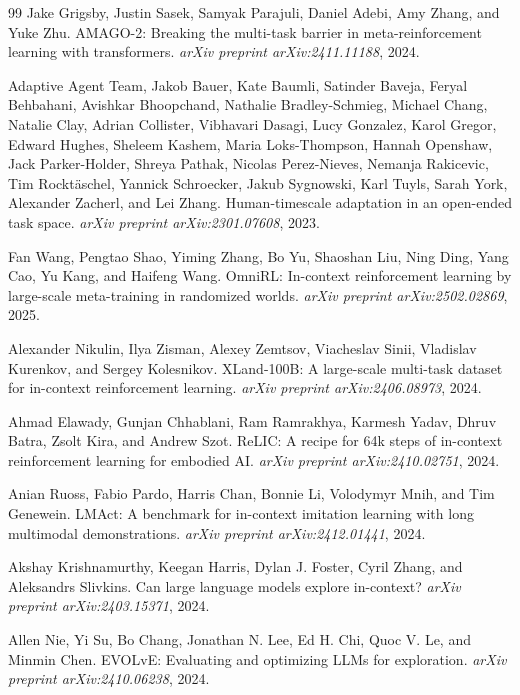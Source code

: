 \documentclass[10pt,twocolumn,letterpaper]{article}
\begin{document}
\begin{thebibliography}{99}
Jake Grigsby, Justin Sasek, Samyak Parajuli, Daniel Adebi, Amy Zhang, and Yuke Zhu.
\newblock AMAGO-2: Breaking the multi-task barrier in meta-reinforcement learning with transformers.
\newblock \emph{arXiv preprint arXiv:2411.11188}, 2024.

Adaptive Agent Team, Jakob Bauer, Kate Baumli, Satinder Baveja, Feryal Behbahani, Avishkar Bhoopchand, Nathalie Bradley-Schmieg, Michael Chang, Natalie Clay, Adrian Collister, Vibhavari Dasagi, Lucy Gonzalez, Karol Gregor, Edward Hughes, Sheleem Kashem, Maria Loks-Thompson, Hannah Openshaw, Jack Parker-Holder, Shreya Pathak, Nicolas Perez-Nieves, Nemanja Rakicevic, Tim Rockt\"aschel, Yannick Schroecker, Jakub Sygnowski, Karl Tuyls, Sarah York, Alexander Zacherl, and Lei Zhang.
\newblock Human-timescale adaptation in an open-ended task space.
\newblock \emph{arXiv preprint arXiv:2301.07608}, 2023.

Fan Wang, Pengtao Shao, Yiming Zhang, Bo Yu, Shaoshan Liu, Ning Ding, Yang Cao, Yu Kang, and Haifeng Wang.
\newblock OmniRL: In-context reinforcement learning by large-scale meta-training in randomized worlds.
\newblock \emph{arXiv preprint arXiv:2502.02869}, 2025.

Alexander Nikulin, Ilya Zisman, Alexey Zemtsov, Viacheslav Sinii, Vladislav Kurenkov, and Sergey Kolesnikov.
\newblock XLand-100B: A large-scale multi-task dataset for in-context reinforcement learning.
\newblock \emph{arXiv preprint arXiv:2406.08973}, 2024.

Ahmad Elawady, Gunjan Chhablani, Ram Ramrakhya, Karmesh Yadav, Dhruv Batra, Zsolt Kira, and Andrew Szot.
\newblock ReLIC: A recipe for 64k steps of in-context reinforcement learning for embodied AI.
\newblock \emph{arXiv preprint arXiv:2410.02751}, 2024.

Anian Ruoss, Fabio Pardo, Harris Chan, Bonnie Li, Volodymyr Mnih, and Tim Genewein.
\newblock LMAct: A benchmark for in-context imitation learning with long multimodal demonstrations.
\newblock \emph{arXiv preprint arXiv:2412.01441}, 2024.

Akshay Krishnamurthy, Keegan Harris, Dylan J. Foster, Cyril Zhang, and Aleksandrs Slivkins.
\newblock Can large language models explore in-context?
\newblock \emph{arXiv preprint arXiv:2403.15371}, 2024.

Allen Nie, Yi Su, Bo Chang, Jonathan N. Lee, Ed H. Chi, Quoc V. Le, and Minmin Chen.
\newblock EVOLvE: Evaluating and optimizing LLMs for exploration.
\newblock \emph{arXiv preprint arXiv:2410.06238}, 2024.


\end{thebibliography}
\end{document}
